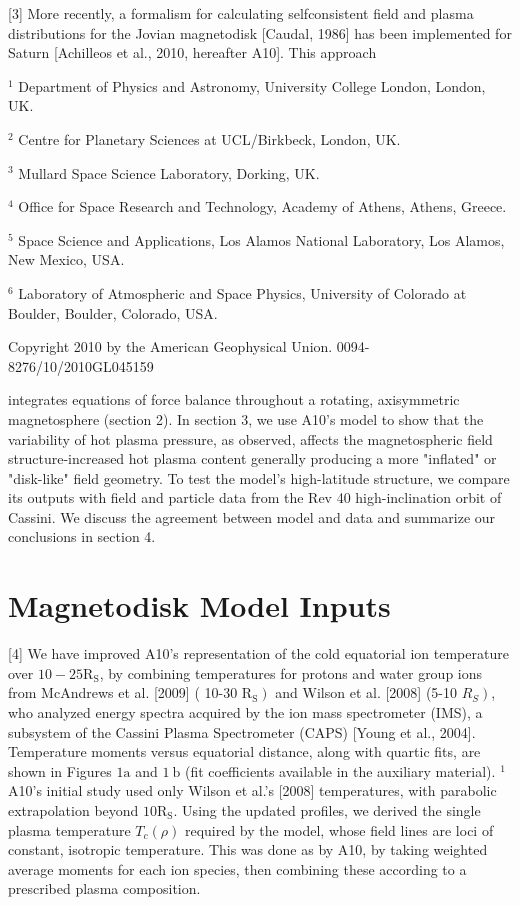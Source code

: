 \documentclass[10pt]{article}
\begin{document}
[3] More recently, a formalism for calculating selfconsistent field and plasma distributions for the Jovian magnetodisk [Caudal, 1986] has been implemented for Saturn [Achilleos et al., 2010, hereafter A10]. This approach

${ }^{1}$ Department of Physics and Astronomy, University College London, London, UK.

${ }^{2}$ Centre for Planetary Sciences at UCL/Birkbeck, London, UK.

${ }^{3}$ Mullard Space Science Laboratory, Dorking, UK.

${ }^{4}$ Office for Space Research and Technology, Academy of Athens, Athens, Greece.

${ }^{5}$ Space Science and Applications, Los Alamos National Laboratory, Los Alamos, New Mexico, USA.

${ }^{6}$ Laboratory of Atmospheric and Space Physics, University of Colorado at Boulder, Boulder, Colorado, USA.

Copyright 2010 by the American Geophysical Union. 0094-8276/10/2010GL045159

integrates equations of force balance throughout a rotating, axisymmetric magnetosphere (section 2). In section 3, we use A10's model to show that the variability of hot plasma pressure, as observed, affects the magnetospheric field structure-increased hot plasma content generally producing a more "inflated" or "disk-like" field geometry. To test the model's high-latitude structure, we compare its outputs with field and particle data from the Rev 40 high-inclination orbit of Cassini. We discuss the agreement between model and data and summarize our conclusions in section 4.

\section{Magnetodisk Model Inputs}
[4] We have improved A10's representation of the cold equatorial ion temperature over $10-25 \mathrm{R}_{\mathrm{S}}$, by combining temperatures for protons and water group ions from McAndrews et al. [2009] ( 10-30 $\left.\mathrm{R}_{\mathrm{S}}\right)$ and Wilson et al. [2008] (5-10 $\left.R_{S}\right)$, who analyzed energy spectra acquired by the ion mass spectrometer (IMS), a subsystem of the Cassini Plasma Spectrometer (CAPS) [Young et al., 2004]. Temperature moments versus equatorial distance, along with quartic fits, are shown in Figures $1 \mathrm{a}$ and $1 \mathrm{~b}$ (fit coefficients available in the auxiliary material). ${ }^{1}$ A10's initial study used only Wilson et al.'s [2008] temperatures, with parabolic extrapolation beyond $10 \mathrm{R}_{\mathrm{S}}$. Using the updated profiles, we derived the single plasma temperature $T_{c}(\rho)$ required by the model, whose field lines are loci of constant, isotropic temperature. This was done as by A10, by taking weighted average moments for each ion species, then combining these according to a prescribed plasma composition.
\end{document}
